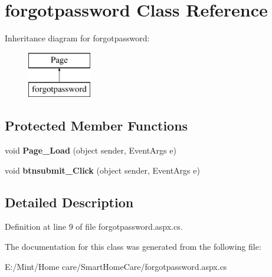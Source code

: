 \hypertarget{classforgotpassword}{\section{forgotpassword Class Reference}
\label{classforgotpassword}
}
Inheritance diagram for forgotpassword\-:\begin{figure}[H]
\begin{center}
\leavevmode
\includegraphics[height=2.000000cm]{classforgotpassword}
\end{center}
\end{figure}
\subsection*{Protected Member Functions}
\begin{DoxyCompactItemize}
\item 
\hypertarget{classforgotpassword_ad24f21574234e4235cdbfc0388977dd6}{void {\bfseries Page\-\_\-\-Load} (object sender, Event\-Args e)}\label{classforgotpassword_ad24f21574234e4235cdbfc0388977dd6}

\item 
\hypertarget{classforgotpassword_aa9f2786e5c66a11f5c9f1c26011e4bf3}{void {\bfseries btnsubmit\-\_\-\-Click} (object sender, Event\-Args e)}\label{classforgotpassword_aa9f2786e5c66a11f5c9f1c26011e4bf3}

\end{DoxyCompactItemize}


\subsection{Detailed Description}


Definition at line 9 of file forgotpassword.\-aspx.\-cs.



The documentation for this class was generated from the following file\-:\begin{DoxyCompactItemize}
\item 
E\-:/\-Mint/\-Home care/\-Smart\-Home\-Care/forgotpassword.\-aspx.\-cs\end{DoxyCompactItemize}
